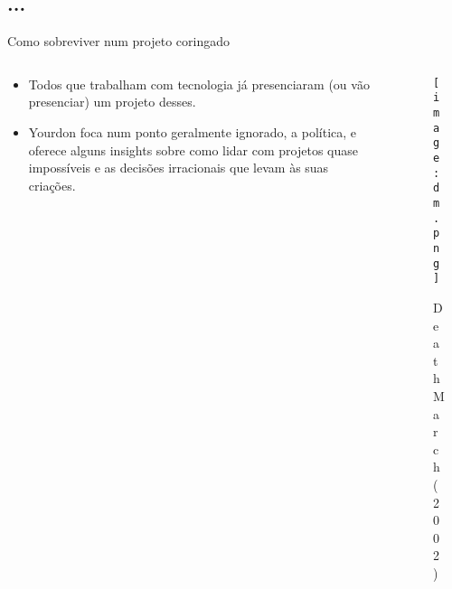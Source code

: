 \documentclass{beamer}
\begin{document}
  \subsection{...}

  \begin{frame}{Como sobreviver num projeto coringado}
    \begin{columns}
        \begin{column}{0.5\textwidth}
            \begin{itemize}[<+->]
                \item<2-> Todos que trabalham com tecnologia já presenciaram (ou vão presenciar) um projeto desses.
                \item<3-> Yourdon foca num ponto geralmente ignorado, a política, e oferece alguns insights sobre como lidar com projetos quase impossíveis e as decisões irracionais que levam às suas criações.
            \end{itemize}
        \end{column}
        \begin{column}{0.5\textwidth}
            \begin{figure}
            \centering
                \texttt{[image: dm.png]}
                \caption{Death March (2002)}
            \end{figure}
        \end{column}
    \end{columns}
  \end{frame}
\end{document}
